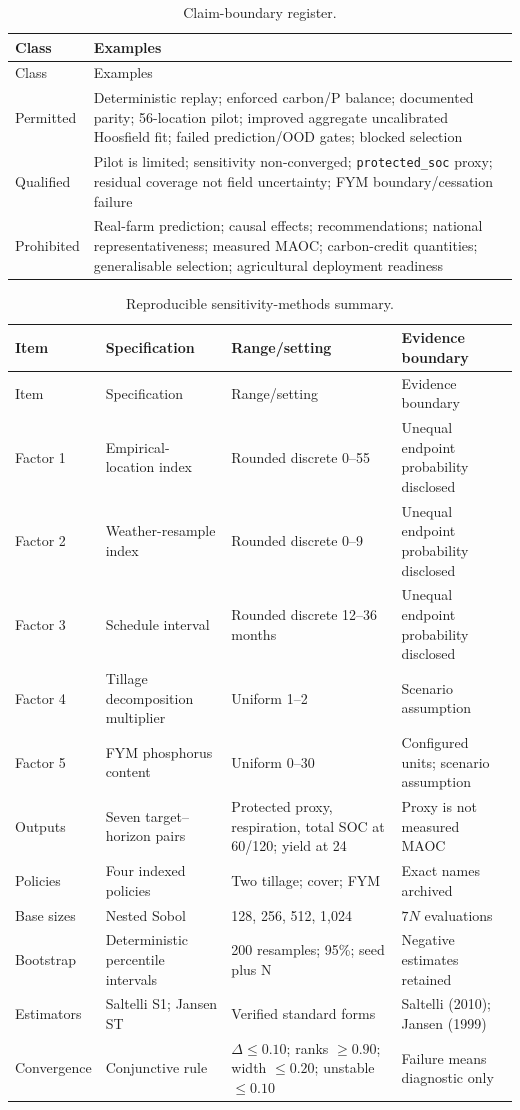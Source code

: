 \documentclass[11pt]{article}
\newcommand{\protectedSOC}{\texttt{protected\_soc}}
\begin{document}
\begin{longtable}{P{0.16\textwidth}P{0.76\textwidth}}
\caption{Claim-boundary register.}\label{tab:claims-supp}\\
\toprule Class & Examples \\
\midrule\endfirsthead
\toprule Class & Examples \\
\midrule\endhead
Permitted & Deterministic replay; enforced carbon/P balance; documented parity; 56-location pilot; improved aggregate uncalibrated Hoosfield fit; failed prediction/OOD gates; blocked selection \\
Qualified & Pilot is limited; sensitivity non-converged; \protectedSOC{} proxy; residual coverage not field uncertainty; FYM boundary/cessation failure \\
Prohibited & Real-farm prediction; causal effects; recommendations; national representativeness; measured MAOC; carbon-credit quantities; generalisable selection; agricultural deployment readiness \\
\bottomrule
\end{longtable}

\begin{longtable}{P{0.15\textwidth}P{0.22\textwidth}P{0.20\textwidth}P{0.25\textwidth}}
\caption{Reproducible sensitivity-methods summary.}\label{tab:sensitivity-methods}\\
\toprule Item & Specification & Range/setting & Evidence boundary \\
\midrule\endfirsthead
\toprule Item & Specification & Range/setting & Evidence boundary \\
\midrule\endhead
Factor 1 & Empirical-location index & Rounded discrete 0--55 & Unequal endpoint probability disclosed \\
Factor 2 & Weather-resample index & Rounded discrete 0--9 & Unequal endpoint probability disclosed \\
Factor 3 & Schedule interval & Rounded discrete 12--36 months & Unequal endpoint probability disclosed \\
Factor 4 & Tillage decomposition multiplier & Uniform 1--2 & Scenario assumption \\
Factor 5 & FYM phosphorus content & Uniform 0--30 & Configured units; scenario assumption \\
Outputs & Seven target--horizon pairs & Protected proxy, respiration, total SOC at 60/120; yield at 24 & Proxy is not measured MAOC \\
Policies & Four indexed policies & Two tillage; cover; FYM & Exact names archived \\
Base sizes & Nested Sobol & 128, 256, 512, 1,024 & $7N$ evaluations \\
Bootstrap & Deterministic percentile intervals & 200 resamples; 95\%; seed plus N & Negative estimates retained \\
Estimators & Saltelli S1; Jansen ST & Verified standard forms & Saltelli (2010); Jansen (1999) \\
Convergence & Conjunctive rule & $\Delta\leq0.10$; ranks $\geq0.90$; width $\leq0.20$; unstable $\leq0.10$ & Failure means diagnostic only \\
\bottomrule
\end{longtable}
\end{document}
